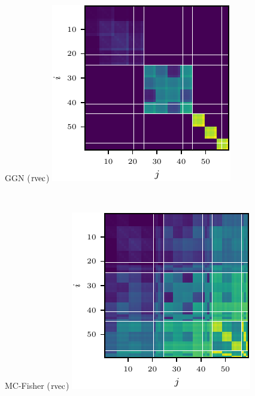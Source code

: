 \begin{figure}[t!]
\begin{minipage}[t]{0.485\linewidth}
    \centering
    GGN ($\operatorname{rvec}$)\vspace{1ex}
    \includegraphics[width=0.8\linewidth]{../kfs/plots/synthetic_rvec_ggn_kfac.pdf}
  \end{minipage}
  \\
  \begin{minipage}[t]{0.485\linewidth}
    \centering
    MC-Fisher ($\operatorname{rvec}$)\vspace{1ex}
    \includegraphics[width=0.8\linewidth]{../kfs/plots/synthetic_rvec_mcfisher_100_full.pdf}
  \end{minipage}
  \hfill
  \begin{minipage}[t]{0.485\linewidth}

\end{minipage}
\end{figure}
